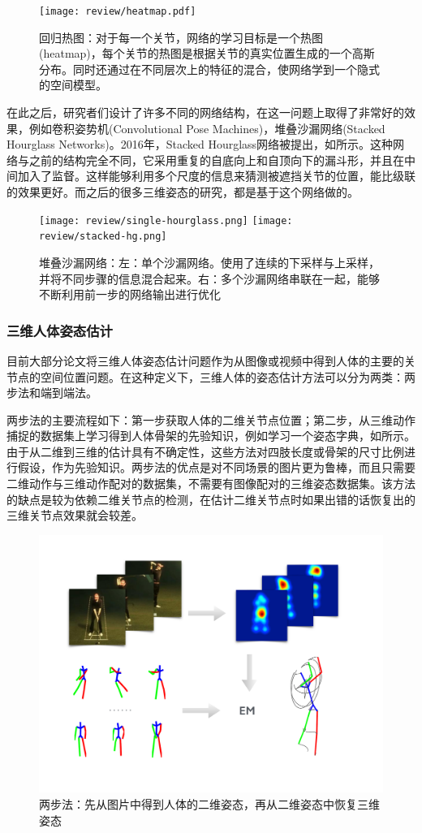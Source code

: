 \begin{figure}[ht]
    \texttt{[image: review/heatmap.pdf]}
    \caption{回归热图\autocite{pfister2015flowing}：对于每一个关节，网络的学习目标是一个热图(heatmap)，每个关节的热图是根据关节的真实位置生成的一个高斯分布。同时还通过在不同层次上的特征的混合，使网络学到一个隐式的空间模型。}\label{fig:heatmap}
\end{figure}

在此之后，研究者们设计了许多不同的网络结构，在这一问题上取得了非常好的效果，例如卷积姿势机(Convolutional Pose Machines)，堆叠沙漏网络(Stacked Hourglass Networks)\autocite{newell2016stacked}。2016年，Stacked Hourglass网络\autocite{newell2016stacked}被提出，如所示。这种网络与之前的结构完全不同，它采用重复的自底向上和自顶向下的漏斗形，并且在中间加入了监督。这样能够利用多个尺度的信息来猜测被遮挡关节的位置，能比级联的效果更好。而之后的很多三维姿态的研究，都是基于这个网络做的。

\begin{figure}[ht]
    \texttt{[image: review/single-hourglass.png]}
    \texttt{[image: review/stacked-hg.png]}
    \caption{堆叠沙漏网络\autocite{newell2016stacked}：左：单个沙漏网络。使用了连续的下采样与上采样，并将不同步骤的信息混合起来。右：多个沙漏网络串联在一起，能够不断利用前一步的网络输出进行优化}\label{fig:hourglass}
\end{figure}


\subsubsection{三维人体姿态估计}
目前大部分论文将三维人体姿态估计问题作为从图像或视频中得到人体的主要的关节点的空间位置问题。在这种定义下，三维人体的姿态估计方法可以分为两类：两步法和端到端法。

两步法的主要流程如下：第一步获取人体的二维关节点位置；第二步，从三维动作捕捉的数据集上学习得到人体骨架的先验知识，例如学习一个姿态字典\autocite{zhou2015sparse}，如所示。由于从二维到三维的估计具有不确定性，这些方法对四肢长度或骨架的尺寸比例进行假设，作为先验知识。两步法的优点是对不同场景的图片更为鲁棒，而且只需要二维动作与三维动作配对的数据集，不需要有图像配对的三维姿态数据集。该方法的缺点是较为依赖二维关节点的检测，在估计二维关节点时如果出错的话恢复出的三维关节点效果就会较差。

\begin{figure}[ht]
    \centering
    \includegraphics[width=0.4\linewidth]{figures/overview.pdf}
    \caption{两步法\autocite{zhou2015sparse}：先从图片中得到人体的二维姿态，再从二维姿态中恢复三维姿态}\label{fig:twostep}
\end{figure}

